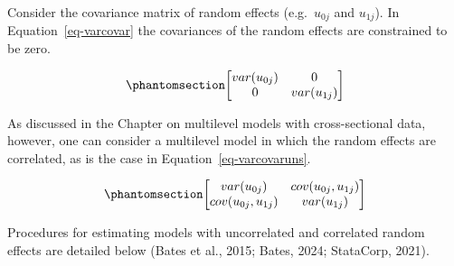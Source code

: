 \documentclass[
  letterpaper,
  DIV=11,
  numbers=noendperiod]{scrreprt}
\begin{document}
Consider the covariance matrix of random effects (e.g.~\(u_{0j}\) and
\(u_{1j}\)). In Equation~\ref{eq-varcovar} the covariances of the random
effects are constrained to be zero.

\begin{equation}\phantomsection\label{eq-varcovar}{\begin{bmatrix}
var(u_{0j}) & 0 \\
0 & var(u_{1j}) 
\end{bmatrix}}\end{equation}

As discussed in the Chapter on multilevel models with cross-sectional
data, however, one can consider a multilevel model in which the random
effects are correlated, as is the case in Equation~\ref{eq-varcovaruns}.

\begin{equation}\phantomsection\label{eq-varcovaruns}{\begin{bmatrix}
var(u_{0j}) & cov(u_{0j}, u_{1j}) \\
cov(u_{0j}, u_{1j}) & var(u_{1j}) 
\end{bmatrix}}\end{equation}

Procedures for estimating models with uncorrelated and correlated random
effects are detailed below (Bates et al., 2015; Bates, 2024; StataCorp,
2021).
\end{document}
